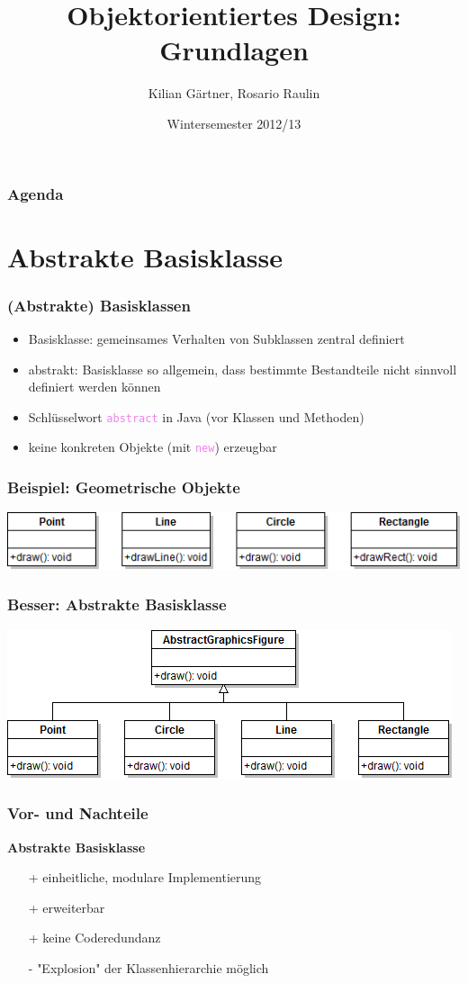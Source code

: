 \documentclass[12pt]{beamer}
\title{Objektorientiertes Design: Grundlagen}
\author{Kilian Gärtner, Rosario Raulin}
\date{Wintersemester 2012/13}
\newcommand{\javakeyword}[1]{\textcolor{violet}{\texttt{{#1}}}}
\begin{document}
\frame{\titlepage}

\begin{frame}
	\frametitle{Agenda}
	\tableofcontents
\end{frame}

\section{Abstrakte Basisklasse}
\begin{frame}
	\frametitle{(Abstrakte) Basisklassen}
	
	\begin{itemize}
		\item Basisklasse: gemeinsames Verhalten von Subklassen zentral definiert
		\item abstrakt: Basisklasse so allgemein, dass bestimmte Bestandteile nicht
		sinnvoll definiert werden können
		\item Schlüsselwort \javakeyword{abstract} in Java (vor Klassen und Methoden)
		\item keine konkreten Objekte (mit \javakeyword{new}) erzeugbar
	\end{itemize}
\end{frame}

\begin{frame}
	\frametitle{Beispiel: Geometrische Objekte}
	\centerline{\includegraphics[scale=0.6]{src/img/Figures}}
\end{frame}

\begin{frame}
	\frametitle{Besser: Abstrakte Basisklasse}
	\centerline{\includegraphics[scale=0.6]{src/img/AbstractGraphicsFigure}}
\end{frame}

\begin{frame}
	\frametitle{Vor- und Nachteile}
	\textbf{Abstrakte Basisklasse}
	\newline
	\begin{itemize}
		\item[+] einheitliche, modulare Implementierung
		\item[+] erweiterbar
		\item[+] keine Coderedundanz
		\item[-] "Explosion" der Klassenhierarchie möglich
	\end{itemize}
\end{frame}
\end{document}
